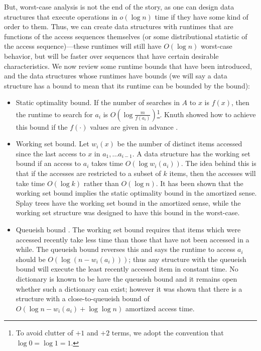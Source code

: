 \documentclass{llncs}
\begin{document}
But, worst-case analysis is not the end of the story, as one can design data structures that execute operations in $o(\log n)$ time if they have some kind of order to them. Thus, we can create data structures with runtimes that are functions of the access sequences themselves (or some distributional statistic of the access sequence)---these runtimes will still have $O(\log n)$ worst-case behavior, but will be faster over sequences that have certain desirable characteristics.
We now review some runtime bounds that have been introduced, and the data structures whose runtimes have bounds (we will say a data structure has a bound to mean that its runtime can be bounded by the bound):


\begin{itemize}
\item Static optimality bound. If the number of searches in $A$ to $x$ is $f(x)$, then the runtime to search for $a_i$ is
$O(\log \frac{m}{f(a_i)})$\footnote{To avoid clutter of $+1$ and $+2$ terms, we adopt the convention that $\log 0=\log 1=1$.}.  Knuth showed how to achieve this bound if the $f(\cdot)$ values are given in advance \cite{DBLP:journals/acta/Knuth71}.

\item Working set bound. Let $w_i(x)$ be the number of distinct items accessed since the last access to $x$ in $a_1, \ldots a_{i-1}$. A data structure has the working set bound if an access to $a_i$ takes time $O(\log w_i(a_i))$.
The idea behind this is that if the accesses are restricted to a subset of $k$ items, then the accesses will take time $O(\log k)$ rather than $O(\log n)$. It has been shown that the working set bound implies the static optimality bound in the amortized sense. Splay trees \cite{DBLP:journals/jacm/SleatorT85} have the working set bound in the amortized sense, while the working set structure \cite{DBLP:conf/soda/Iacono01a} was designed to have this bound in the worst-case.

\item Queueish bound \cite{DBLP:journals/algorithmica/IaconoL05}. The working set bound requires that items which were accessed recently take less time than those that have not been accessed in a while. The queueish bound reverses this and says the runtime to access $a_i$ should be $O(\log( n-w_i(a_i)))$; thus any structure with the queueish bound will execute the least recently accessed item in constant time. No dictionary is known to be have the queueish bound and it remains open whether such a dictionary can exist; however it was shown that there is a structure with a close-to-queueish bound of $O(\log n-w_i(a_i)+\log \log n)$ amortized access time.



\end{itemize}
\end{document}
